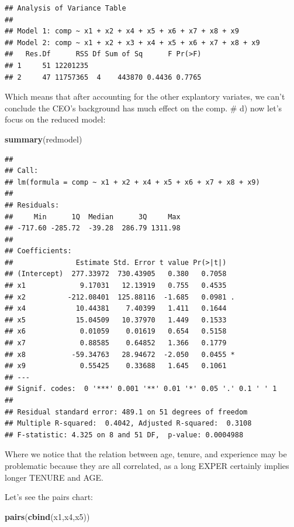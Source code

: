 \documentclass[
]{article}
\newenvironment{Shaded}{\begin{snugshade}}{\end{snugshade}}
\newcommand{\FunctionTok}[1]{\textcolor[rgb]{0.13,0.29,0.53}{\textbf{#1}}}
\newcommand{\NormalTok}[1]{#1}
\begin{document}
\begin{verbatim}
## Analysis of Variance Table
## 
## Model 1: comp ~ x1 + x2 + x4 + x5 + x6 + x7 + x8 + x9
## Model 2: comp ~ x1 + x2 + x3 + x4 + x5 + x6 + x7 + x8 + x9
##   Res.Df      RSS Df Sum of Sq      F Pr(>F)
## 1     51 12201235                           
## 2     47 11757365  4    443870 0.4436 0.7765
\end{verbatim}

Which means that after accounting for the other explantory variates, we
can't conclude the CEO's background has much effect on the comp. \# d)
now let's focus on the reduced model:

\begin{Shaded}
\begin{Highlighting}[]
\FunctionTok{summary}\NormalTok{(redmodel)}
\end{Highlighting}
\end{Shaded}

\begin{verbatim}
## 
## Call:
## lm(formula = comp ~ x1 + x2 + x4 + x5 + x6 + x7 + x8 + x9)
## 
## Residuals:
##     Min      1Q  Median      3Q     Max 
## -717.60 -285.72  -39.28  286.79 1311.98 
## 
## Coefficients:
##               Estimate Std. Error t value Pr(>|t|)  
## (Intercept)  277.33972  730.43905   0.380   0.7058  
## x1             9.17031   12.13919   0.755   0.4535  
## x2          -212.08401  125.88116  -1.685   0.0981 .
## x4            10.44381    7.40399   1.411   0.1644  
## x5            15.04509   10.37970   1.449   0.1533  
## x6             0.01059    0.01619   0.654   0.5158  
## x7             0.88585    0.64852   1.366   0.1779  
## x8           -59.34763   28.94672  -2.050   0.0455 *
## x9             0.55425    0.33688   1.645   0.1061  
## ---
## Signif. codes:  0 '***' 0.001 '**' 0.01 '*' 0.05 '.' 0.1 ' ' 1
## 
## Residual standard error: 489.1 on 51 degrees of freedom
## Multiple R-squared:  0.4042, Adjusted R-squared:  0.3108 
## F-statistic: 4.325 on 8 and 51 DF,  p-value: 0.0004988
\end{verbatim}

Where we notice that the relation between age, tenure, and experience
may be problematic because they are all correlated, as a long EXPER
certainly implies longer TENURE and AGE.

Let's see the pairs chart:

\begin{Shaded}
\begin{Highlighting}[]
\FunctionTok{pairs}\NormalTok{(}\FunctionTok{cbind}\NormalTok{(x1,x4,x5))}
\end{Highlighting}
\end{Shaded}
\end{document}
